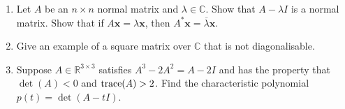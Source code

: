 \documentclass[12pt]{article}
\begin{document}
\begin{enumerate}[leftmargin=*]
	 \item Let $A$ be an $n \times n$ normal matrix and $\lambda \in \mathbb{C}$. \newline
	 Show that $A - \lambda I$ is a normal matrix. \newline
	 Show that if $A \mathbf{x} = \lambda \mathbf{x}$, then $A^{\ast} \mathbf{x} = \overline{\lambda} \mathbf{x}$.
	 \item Give an example of a square matrix over $\mathbb{C}$ that is not diagonalisable.
	 \item Suppose $A \in \mathbb{R}^{3 \times 3}$ satisfies $A^{3} - 2A^{2} = A - 2I$ and has the property that $\det(A) < 0$ and $\operatorname{trace}(A) > 2$. \newline
	 Find the characteristic polynomial $p(t) = \det(A - tI)$.
\end{enumerate}
\end{document}
